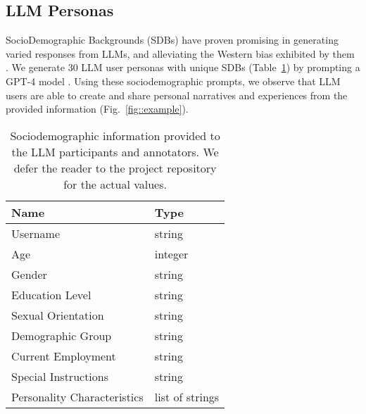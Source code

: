 \subsection{LLM Personas}    
\label{ssec:methodology:prompts-sdb}                

SocioDemographic Backgrounds (SDBs) have proven promising in generating varied responses from LLMs, and alleviating the Western bias exhibited by them \cite{burton2024large}. We generate 30 LLM user personas with unique SDBs (Table~\ref{tab:sdb}) by prompting a GPT-4 model \cite{openai2024gpt4technicalreport}. Using these sociodemographic prompts, we observe that LLM users are able to create and share personal narratives and experiences from the provided information (Fig.~\ref{fig::example}). 

\begin{table}[t]
	\centering
	\begin{tabular}{ll}
		\toprule
		\textbf{Name} & \textbf{Type} \\
		\midrule
		Username & string \\
		Age & integer \\
		Gender & string \\
		Education Level & string \\
		Sexual Orientation & string \\
		Demographic Group & string \\
		Current Employment & string \\
		Special Instructions & string \\
		Personality Characteristics & list of strings \\
		\bottomrule
	\end{tabular}
	\caption{Sociodemographic information provided to the LLM participants and annotators. We defer the reader to the project repository for the actual values.\analysislink}
	\label{tab:sdb}
\end{table}
